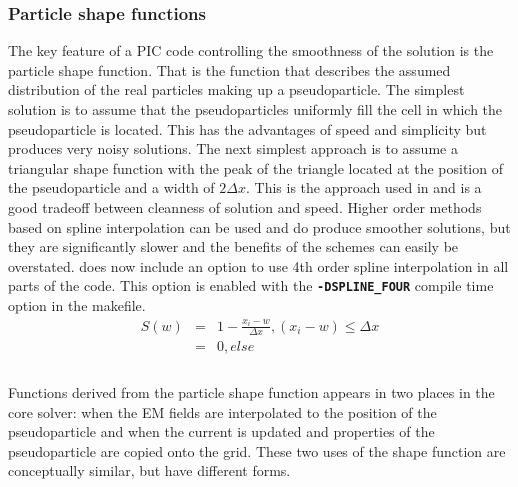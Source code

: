 \documentclass[12pt,a4paper]{article}
\newcommand{\inlinecode}[1]{{\color{warwickred} \bf\texttt{#1}}}
\newcommand{\EPOCH}{{\color{warwickdark}\fontfamily{phv}\selectfont{EPOCH}}}
\begin{document}
\subsubsection{Particle shape functions}
The key feature of a PIC code controlling the smoothness of the solution is the
particle shape function. That is the function that describes the assumed
distribution of the real particles making up a pseudoparticle. The simplest
solution is to assume that the pseudoparticles uniformly fill the cell in which
the pseudoparticle is located. This has the advantages of speed and simplicity
but produces very noisy solutions. The next simplest approach is to assume a
triangular shape function with the peak of the triangle located at the position
of the pseudoparticle and a width of $ 2 \Delta x$. This is the approach used
in {\EPOCH} and is a good tradeoff between cleanness of solution and
speed. Higher order methods based on spline interpolation can be used and do
produce smoother solutions, but they are significantly slower and the benefits
of the schemes can easily be overstated. {\EPOCH} does now include an option to
use 4th order spline interpolation in all parts of the code. This option is
enabled with the \inlinecode{-DSPLINE\_FOUR} compile time option in the
makefile.\\
\begin{eqnarray*}
S(w)&=&1-\frac{x_i-w}{\Delta x}, (x_i-w) \le \Delta x\\
&=&0, else\\
\end{eqnarray*}
\\
Functions derived from the particle shape function appears in two places in the
core solver: when the EM fields are interpolated to the position of the
pseudoparticle and when the current is updated and properties of the
pseudoparticle are copied onto the grid. These two uses of the shape function
are conceptually similar, but have different forms.
\end{document}
